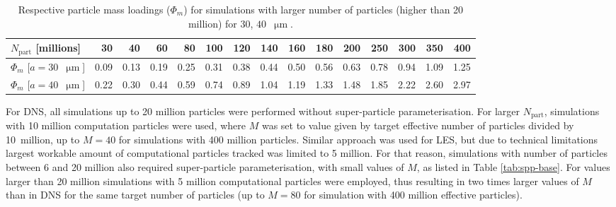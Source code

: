 \documentclass{pracamgren}
\begin{document}
\begin{table}[h]
\centering
\scriptsize
\begin{tabular}{lrrrrrrrrrrrrrr}
$N_{\text{part}}$ [millions] & 30 & 40 & 60 & 80 & 100 & 120 & 140 & 160 & 180 & 200 & 250 & 300 & 350 & 400 \\ \hline
$\Phi_m$ [$a = 30$~$\upmu\text{m}$] & 0.09 & 0.13 & 0.19 & 0.25 & 0.31 & 0.38 & 0.44 & 0.50 & 0.56 & 0.63 & 0.78 & 0.94 & 1.09 & 1.25 \\
$\Phi_m$ [$a = 40$~$\upmu\text{m}$] & 0.22 & 0.30 & 0.44 & 0.59 & 0.74 & 0.89 & 1.04 & 1.19 & 1.33 & 1.48 & 1.85 & 2.22 & 2.60 & 2.97 \\
\end{tabular}
\caption{Respective particle mass loadings ($\Phi_m$) for simulations with larger number of particles (higher than 20 million) for $30$, $40$~$\upmu\text{m}$.
}
\label{tab:spp-ext}
\end{table}


For DNS, all simulations up to 20 million particles were performed without super-particle parameterisation.
For larger $N_{\text{part}}$, simulations with 10 million computation particles were used, where $M$ was set to value given by target effective number of particles divided by 10~million, up to $M = 40$ for simulations with 400 million particles.
Similar approach was used for LES, but due to technical limitations largest workable amount of computational particles tracked was limited to 5 million.
For that reason, simulations with number of particles between 6 and 20 million also required super-particle parameterisation, with small values of $M$, as listed in Table \ref{tab:spp-base}.
For values larger than 20 million simulations with 5 million computational particles were employed, thus resulting in two times larger values of $M$ than in DNS for the same target number of particles (up to $M=80$ for simulation with 400 million effective particles).








\printbibliography[title=References]
\end{document}
